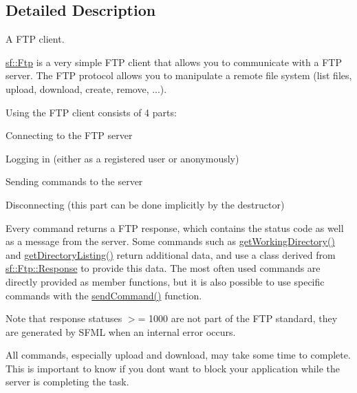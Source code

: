 \subsection{Detailed Description}
A F\+TP client. 

\hyperlink{classsf_1_1_ftp}{sf\+::\+Ftp} is a very simple F\+TP client that allows you to communicate with a F\+TP server. The F\+TP protocol allows you to manipulate a remote file system (list files, upload, download, create, remove, ...).

Using the F\+TP client consists of 4 parts\+: \begin{DoxyItemize}
\item Connecting to the F\+TP server \item Logging in (either as a registered user or anonymously) \item Sending commands to the server \item Disconnecting (this part can be done implicitly by the destructor)\end{DoxyItemize}
Every command returns a F\+TP response, which contains the status code as well as a message from the server. Some commands such as \hyperlink{classsf_1_1_ftp_a79c654fcdd0c81e68c4fa29af3b45e0c}{get\+Working\+Directory()} and \hyperlink{classsf_1_1_ftp_a8f37258e461fcb9e2a0655e9df0be4a0}{get\+Directory\+Listing()} return additional data, and use a class derived from \hyperlink{classsf_1_1_ftp_1_1_response}{sf\+::\+Ftp\+::\+Response} to provide this data. The most often used commands are directly provided as member functions, but it is also possible to use specific commands with the \hyperlink{classsf_1_1_ftp_a44e095103ecbce175a33eaf0820440ff}{send\+Command()} function.

Note that response statuses $>$= 1000 are not part of the F\+TP standard, they are generated by S\+F\+ML when an internal error occurs.

All commands, especially upload and download, may take some time to complete. This is important to know if you don\textquotesingle{}t want to block your application while the server is completing the task.

